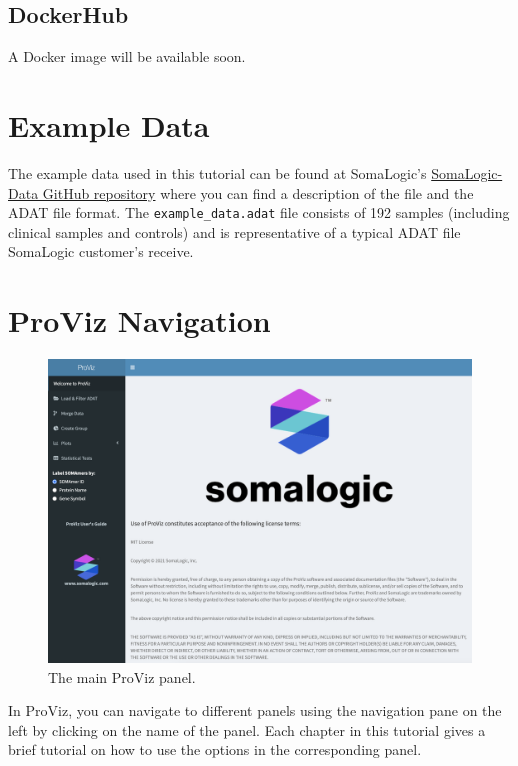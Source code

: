 \documentclass[
]{book}
\begin{document}
\hypertarget{dockerhub}{%
\subsection{DockerHub}\label{dockerhub}}

A Docker image will be available soon.

\hypertarget{example-data}{%
\section{Example Data}\label{example-data}}

The example data used in this tutorial can be found at SomaLogic's \href{https://github.com/SomaLogic/SomaLogic-Data}{SomaLogic-Data GitHub repository} where you can find a description of the file and the ADAT file format. The \texttt{example\_data.adat} file consists of 192 samples (including clinical samples and controls) and is representative of a typical ADAT file SomaLogic customer's receive.

\hypertarget{proviz-navigation}{%
\section{ProViz Navigation}\label{proviz-navigation}}

\begin{figure}
\centering
\includegraphics{images/ProViz_main.png}
\caption{The main ProViz panel.}
\end{figure}

In ProViz, you can navigate to different panels using the navigation pane on the left by clicking on the name of the panel. Each chapter in this tutorial gives a brief tutorial on how to use the options in the corresponding panel.
\end{document}
